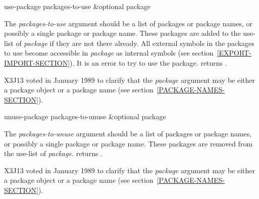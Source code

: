 \begin{defun}[Function]
use-package packages-to-use &optional package

The {\it packages-to-use} argument should be a list of packages or package
names, or possibly a single package or package name.  These packages are
added to the use-list of {\it package} if they are not there already.  All
external symbols in the packages to use become accessible in {\it package}
as internal symbols
(see section~\ref{EXPORT-IMPORT-SECTION}).
It is an error to try to use the  package.
 returns {\true}.

\begin{new}
X3J13 voted in January 1989
to clarify that the {\it package} argument may be either a package object
or a package name (see section~\ref{PACKAGE-NAMES-SECTION}).
\end{new}
\end{defun}

\begin{defun}[Function]
unuse-package packages-to-unuse &optional package

The {\it packages-to-unuse} argument should be a list of packages or
package names, or possibly a single package or package name.  These
packages are removed from the use-list of {\it package}.
 returns {\true}.

\begin{new}
X3J13 voted in January 1989
to clarify that the {\it package} argument may be either a package object
or a package name (see section~\ref{PACKAGE-NAMES-SECTION}).
\end{new}
\end{defun}

